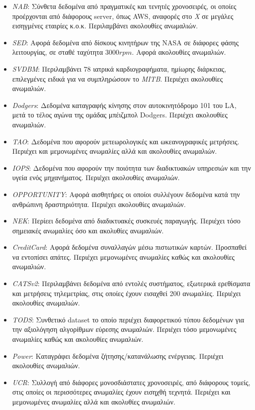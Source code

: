 \begin{itemize}
    \item \emph{NAB}: Σύνθετα δεδομένα από πραγματικές και τενητές χρονοσειρές, οι οποίες προέρχονται από διάφορους server, όπως AWS, αναφορές στο \emph{X} σε μεγάλες εισηγμένες εταιρίες κ.ο.κ. Περιλαμβάνει ακολουθίες ανωμαλιών.
    \item \emph{SED}: Αφορά δεδομένα από δίσκους κινητήρων της NASA σε διάφορες φάσης λειτουργίας, σε σταθέ ταχύτητα $3000 rpm$. Αφορά ακολουθίες ανωμαλιών.
    \item \emph{SVDBM}: Περιλαμβάνει 78 ιατρικά καρδιογραφήματα, ημίωρης διάρκειας, επιλεγμένες ειδικά για να συμπληρώσουν το \emph{MITB}. Περιέχει ακολουθίες ανωμαλιών.
    \item \emph{Dodgers}: Δεδομένα καταγραφής κίνησης στον αυτοκινητόδρομο 101 του LA, μετά το τέλος αγώνα της ομάδας μπέιζμπολ Dodgers. Περιέχει ακολουθίες ανωμαλιών.
    \item \emph{TAO}: Δεδομένα που αφορούν μετεωρολογικές και ωκεανογραφικές μετρήσεις. Περιέχει και μεμονωμένες ανωμαλίες αλλά και ακολουθίες ανωμαλιών.
    \item \emph{IOPS}: Δεδομένα που αφορούν την ποιότητα των διαδικτυακών υπηρεσιών και την υγεία ενός μηχανήματος. Περιέχει ακολουθίες ανωμαλιών.
    \item \emph{OPPORTUNITY}: Αφορά αισθητήρες οι οποίοι συλλέγουν δεδομένα κατά την ανθρώπινη δραστηριότητα. Περιέχει ακολουθίες ανωμαλιών.
    \item \emph{NEK}: Περίεει δεδομένα από διαδικτυακές συσκευές παραγωγής. Περιέχει τόσο σημειακές ανωμαλίες όσο και ακολυθίες ανωμαλιών.
    \item \emph{CreditCard}: Αφορά δεδομένα συναλλαγών μέσω πιστωτικών καρτών. Προσπαθεί να εντοπίσει απάτες. Περιέχει μεμονωμένες ανωμαλίες καθώς και ακολουθίες ανωμαλιών.
    \item \emph{CATSv2}: Περιλαμβάνει δεδομένα από εντολές συστήματος, εξωτερικά ερεθίσματα και μετρήσεις τηλεμετρίας, στις οποίες έχουν εισαχθεί 200 ανωμαλίες. Περιέχει ακολουθίες ανωμαλιών.
    \item \emph{TODS}: Συνθετικό dataset το οποίο περιέχει διαφορετικού τύπου δεδομένων για την αξιολόγηση αλγορίθμων εύρεσης ανωμαλιών. Περιέχει τόσο μεμονωμένες ανωμαλίες καθώς και ακολουθίες ανωμαλιών.
    \item \emph{Power}: Καταγράφει δεδομένα ζήτησης/κατανάλωσης ενέργειας. Περιέχει ακολουθίες ανωμαλιών.
    \item \emph{UCR}: Συλλογή από διάφορες μονοσδιάστατες χρονοσειρές, από διάφορους τομείς, στις οποίες οι περισσότερες ανωμαλίες έχουν εισηχθή τεχνητά. Περιέχει και μεμονωμένες ανωμαλίες αλλά και ακολυθίες ανωμαλιών.

\end{itemize}

